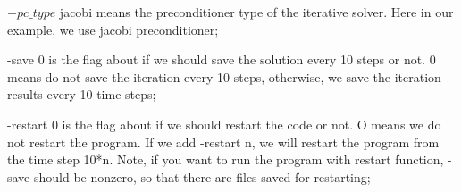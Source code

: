 \documentclass[a4paper,12pt]{article}
\begin{document}
\(-pc\_type\) jacobi means the preconditioner type of the iterative solver. Here in our example, we use jacobi preconditioner;

-save 0 is the flag about if we should save the solution every 10 steps or not. 0 means do not save the iteration every 10 steps, otherwise, we save the iteration results every 10 time steps;

-restart 0 is the flag about if we should restart the code or not. O means we do not restart the program. If we add -restart n, we will restart the program from the time step 10*n. Note, if you want to run the program with restart function, -save should be nonzero, so that there are files saved for restarting; 


\newpage


\end{document}

